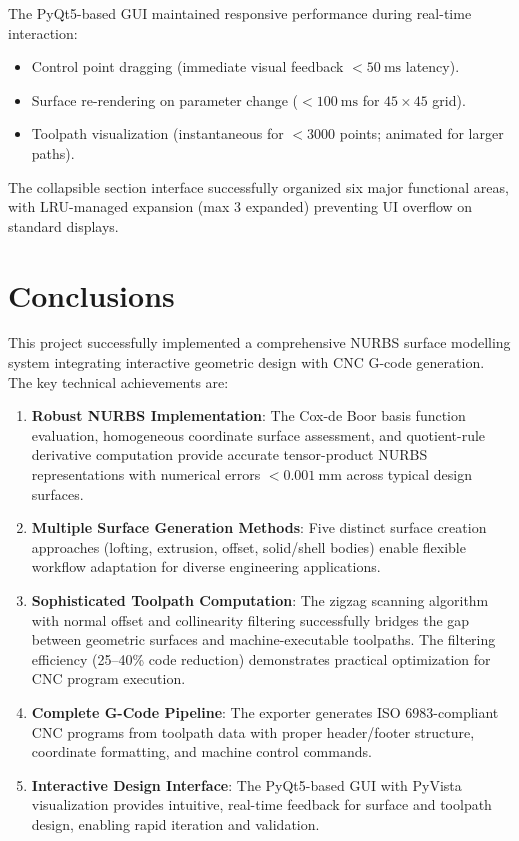 \documentclass[a4paper,12pt]{article}
\begin{document}
The PyQt5-based GUI maintained responsive performance during real-time
interaction:
\begin{itemize}
  \item Control point dragging (immediate visual feedback $< 50~\text{ms}$
    latency).
  \item Surface re-rendering on parameter change ($< 100~\text{ms}$ for
    $45 \times 45$ grid).
  \item Toolpath visualization (instantaneous for $< 3000$ points; animated
    for larger paths).
\end{itemize}

The collapsible section interface successfully organized six major functional
areas, with LRU-managed expansion (max 3 expanded) preventing UI overflow on
standard displays.

\section{Conclusions}

This project successfully implemented a comprehensive NURBS surface modelling
system integrating interactive geometric design with CNC G-code generation.
The key technical achievements are:

\begin{enumerate}
  \item \textbf{Robust NURBS Implementation}: The Cox-de Boor basis function
    evaluation, homogeneous coordinate surface assessment, and quotient-rule
    derivative computation provide accurate tensor-product NURBS representations
    with numerical errors $< 0.001~\text{mm}$ across typical design surfaces.

  \item \textbf{Multiple Surface Generation Methods}: Five distinct surface
    creation approaches (lofting, extrusion, offset, solid/shell bodies) enable
    flexible workflow adaptation for diverse engineering applications.

  \item \textbf{Sophisticated Toolpath Computation}: The zigzag scanning
    algorithm with normal offset and collinearity filtering successfully bridges
    the gap between geometric surfaces and machine-executable toolpaths. The
    filtering efficiency (25--40\% code reduction) demonstrates practical
    optimization for CNC program execution.

  \item \textbf{Complete G-Code Pipeline}: The exporter generates ISO 6983-compliant
    CNC programs from toolpath data with proper header/footer structure,
    coordinate formatting, and machine control commands.

  \item \textbf{Interactive Design Interface}: The PyQt5-based GUI with PyVista
    visualization provides intuitive, real-time feedback for surface and
    toolpath design, enabling rapid iteration and validation.
\end{enumerate}
\end{document}
